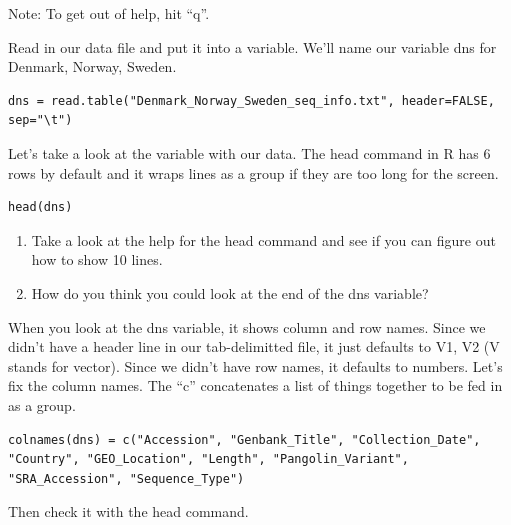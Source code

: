\documentclass[
]{book}
\begin{document}
Note: To get out of help, hit ``q''.

Read in our data file and put it into a variable. We'll name our variable dns for Denmark, Norway, Sweden.

\begin{verbatim}
dns = read.table("Denmark_Norway_Sweden_seq_info.txt", header=FALSE, sep="\t")
\end{verbatim}

Let's take a look at the variable with our data. The head command in R has 6 rows by default and it wraps lines as a group if they are too long for the screen.

\begin{verbatim}
head(dns)
\end{verbatim}

\begin{enumerate}
\def\labelenumi{\arabic{enumi}.}
\setcounter{enumi}{13}
\item
  Take a look at the help for the head command and see if you can figure out how to show 10 lines.
\item
  How do you think you could look at the end of the dns variable?
\end{enumerate}

When you look at the dns variable, it shows column and row names. Since we didn't have a header line in our tab-delimitted file, it just defaults to V1, V2 (V stands for vector). Since we didn't have row names, it defaults to numbers. Let's fix the column names. The ``c'' concatenates a list of things together to be fed in as a group.

\begin{verbatim}
colnames(dns) = c("Accession", "Genbank_Title", "Collection_Date", "Country", "GEO_Location", "Length", "Pangolin_Variant", "SRA_Accession", "Sequence_Type")
\end{verbatim}

Then check it with the head command.
\end{document}

